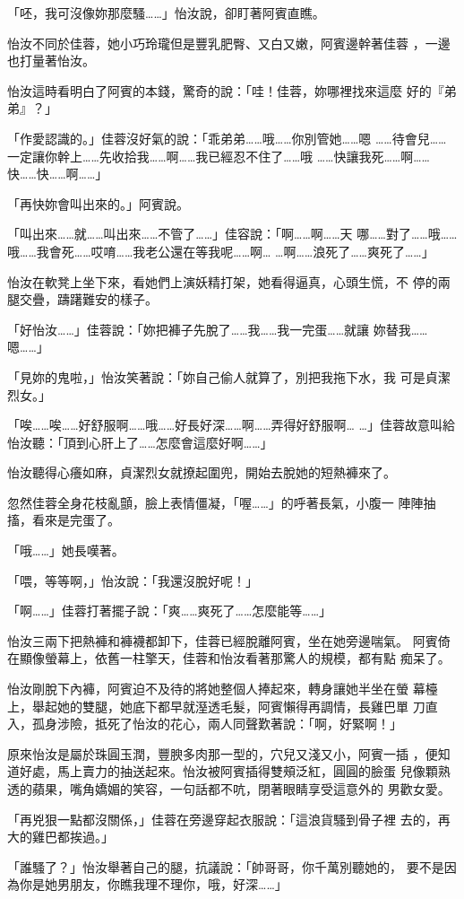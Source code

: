 「呸，我可沒像妳那麼騷……」怡汝說，卻盯著阿賓直瞧。

怡汝不同於佳蓉，她小巧玲瓏但是豐乳肥臀、又白又嫩，阿賓邊幹著佳蓉
，一邊也打量著怡汝。

怡汝這時看明白了阿賓的本錢，驚奇的說：「哇！佳蓉，妳哪裡找來這麼
好的『弟弟』？」

「作愛認識的。」佳蓉沒好氣的說：「乖弟弟……哦……你別管她……嗯
……待會兒……一定讓你幹上……先收拾我……啊……我已經忍不住了……哦
……快讓我死……啊……快……快……啊……」

「再快妳會叫出來的。」阿賓說。

「叫出來……就……叫出來……不管了……」佳容說：「啊……啊……天
哪……對了……哦……哦……我會死……哎唷……我老公還在等我呢……啊…
…啊……浪死了……爽死了……」

怡汝在軟凳上坐下來，看她們上演妖精打架，她看得逼真，心頭生慌，不
停的兩腿交疊，躊躇難安的樣子。

「好怡汝……」佳蓉說：「妳把褲子先脫了……我……我一完蛋……就讓
妳替我……嗯……」

「見妳的鬼啦，」怡汝笑著說：「妳自己偷人就算了，別把我拖下水，我
可是貞潔烈女。」

「唉……唉……好舒服啊……哦……好長好深……啊……弄得好舒服啊…
…」佳蓉故意叫給怡汝聽：「頂到心肝上了……怎麼會這麼好啊……」

怡汝聽得心癢如麻，貞潔烈女就撩起圍兜，開始去脫她的短熱褲來了。

忽然佳蓉全身花枝亂顫，臉上表情僵凝，「喔……」的呼著長氣，小腹一
陣陣抽搐，看來是完蛋了。

「哦……」她長嘆著。

「喂，等等啊，」怡汝說：「我還沒脫好呢！」

「啊……」佳蓉打著擺子說：「爽……爽死了……怎麼能等……」

怡汝三兩下把熱褲和褲襪都卸下，佳蓉已經脫離阿賓，坐在她旁邊喘氣。
阿賓倚在顯像螢幕上，依舊一柱擎天，佳蓉和怡汝看著那驚人的規模，都有點
痴呆了。

怡汝剛脫下內褲，阿賓迫不及待的將她整個人捧起來，轉身讓她半坐在螢
幕檯上，舉起她的雙腿，她底下都早就溼透毛髮，阿賓懶得再調情，長雞巴單
刀直入，孤身涉險，抵死了怡汝的花心，兩人同聲歎著說：「啊，好緊啊！」

原來怡汝是屬於珠圓玉潤，豐腴多肉那一型的，穴兒又淺又小，阿賓一插
，便知道好處，馬上賣力的抽送起來。怡汝被阿賓插得雙頰泛紅，圓圓的臉蛋
兒像顆熟透的蘋果，嘴角嬌媚的笑容，一句話都不吭，閉著眼睛享受這意外的
男歡女愛。

「再兇狠一點都沒關係，」佳蓉在旁邊穿起衣服說：「這浪貨騷到骨子裡
去的，再大的雞巴都挨過。」

「誰騷了？」怡汝舉著自己的腿，抗議說：「帥哥哥，你千萬別聽她的，
要不是因為你是她男朋友，你瞧我理不理你，哦，好深……」

